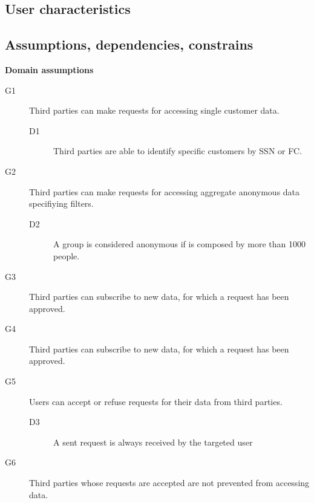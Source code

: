 \documentclass[../main.tex]{subfiles}
\begin{document}
\subsection{User characteristics}
\subsection{Assumptions, dependencies, constrains}

{\bf Domain assumptions}

\begin{description}

	\item [G1] Third parties can make requests for accessing single customer data.
	\begin{description}
		\item [D1] Third parties are able to identify specific customers by SSN or FC.
	\end{description}

	\item [G2] Third parties can make requests for accessing aggregate anonymous data specifiying filters.
	\begin{description}
		\item [D2] A group is considered anonymous if is composed by more than 1000 people.
	\end{description}

	\item [G3] Third parties can subscribe to new data, for which a request has been approved.
	\begin{description}
		\item %
	\end{description}

	\item [G4] Third parties can subscribe to new data, for which a request has been approved.
	\begin{description}
		\item
	\end{description}

	\item [G5]  Users can accept or refuse requests for their data from third parties.
	\begin{description}
		\item [D3]  A sent request is always received by the targeted user
	\end{description}

	\item [G6]  Third parties whose requests are accepted are not prevented from accessing data.
	\begin{description}
		\item
	\end{description}


\end{description}
\end{document}
